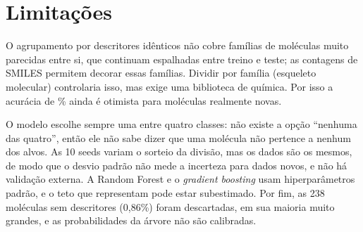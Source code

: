 \section{Limitações}

O agrupamento por descritores idênticos não cobre famílias de moléculas muito parecidas entre si, que continuam espalhadas entre treino e teste; as contagens de SMILES permitem decorar essas famílias. Dividir por família (esqueleto molecular) controlaria isso, mas exige uma biblioteca de química. Por isso a acurácia de \accGrupAmbos\% ainda é otimista para moléculas realmente novas.

O modelo escolhe sempre uma entre quatro classes: não existe a opção ``nenhuma das quatro'', então ele não sabe dizer que uma molécula não pertence a nenhum dos alvos. As 10 seeds variam o sorteio da divisão, mas os dados são os mesmos, de modo que o desvio padrão não mede a incerteza para dados novos, e não há validação externa. A Random Forest e o \emph{gradient boosting} usam hiperparâmetros padrão, e o teto que representam pode estar subestimado. Por fim, as 238 moléculas sem descritores (0,86\%) foram descartadas, em sua maioria muito grandes, e as probabilidades da árvore não são calibradas.
